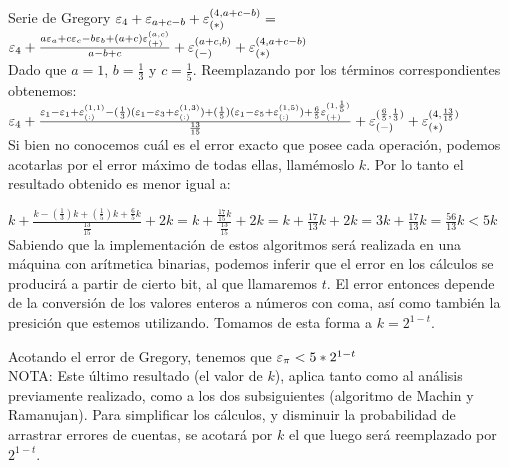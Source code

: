 \begin{subsection}{Serie de Gregory}
	$\varepsilon _{4} + \varepsilon _{a+c-b} + \varepsilon _{({*})}^{({4,a+c-b})} =$\\
	
	$\varepsilon _{4} + \frac{a\varepsilon _{a} + c\varepsilon _{c} - b\varepsilon _{b} + (a+c)\varepsilon _{({+})}^{({a,c})}}{a-b+c} + \varepsilon _{({-})}^{({a+c,b})} + \varepsilon _{({*})}^{({4,a+c-b})}$\\
	
	Dado que $a=1$, $b=\frac{1}{3}$ y $c=\frac{1}{5}$. Reemplazando por los términos correspondientes obtenemos:\\
	
	$\varepsilon _{4} + \frac{\varepsilon _{1} - \varepsilon _{1} + \varepsilon _{({:})}^{({1,1})} - (\frac{1}{3})(\varepsilon _{1} - \varepsilon _{3} + \varepsilon _{({:})}^{({1,3})}) + (\frac{1}{5})(\varepsilon _{1} - \varepsilon _{5} + \varepsilon _{({:})}^{({1,5})}) + \frac{6}{5} \varepsilon _{({+})}^{({1,\frac{1}{5}})}}{\frac{13}{15}} + \varepsilon _{({-})}^{({\frac{6}{5},\frac{1}{3}})} + \varepsilon _{({*})}^{({4,\frac{13}{15}})}$\\
	
	Si bien no conocemos cuál es el error exacto que posee cada operación, podemos acotarlas por el error máximo de todas ellas, llamémoslo $k$. Por lo tanto el resultado obtenido es menor igual a:

$k + \frac{k - (\frac{1}{3})k + (\frac{1}{5})k + \frac{6}{5}k}{\frac{13}{15}} + 2k = k + \frac{\frac{17}{15}k}{\frac{13}{15}} + 2k = k + \frac{17}{13}k + 2k = 3k + \frac{17}{13}k = \frac{56}{13}k < 5k $ \\

	Sabiendo que la implementación de estos algoritmos será realizada en una máquina con arítmetica binarias, podemos inferir que el error en los cálculos se producirá a partir de cierto bit, al que llamaremos $t$. El error entonces depende de la conversión de los valores enteros a números con coma, así como también la presición que estemos utilizando. Tomamos de esta forma a $k=2^{1-t}$.
	
	Acotando el error de Gregory, tenemos que $\varepsilon _{\pi} < 5*2^{1-t}$\\
	
	NOTA: Este último resultado (el valor de $k$), aplica tanto como al análisis previamente realizado, como a los dos subsiguientes (algoritmo de Machin y Ramanujan). Para simplificar los cálculos, y disminuir la probabilidad de arrastrar errores de cuentas, se acotará por $k$ el que luego será reemplazado por $2^{1-t}$.
	
\end{subsection}
